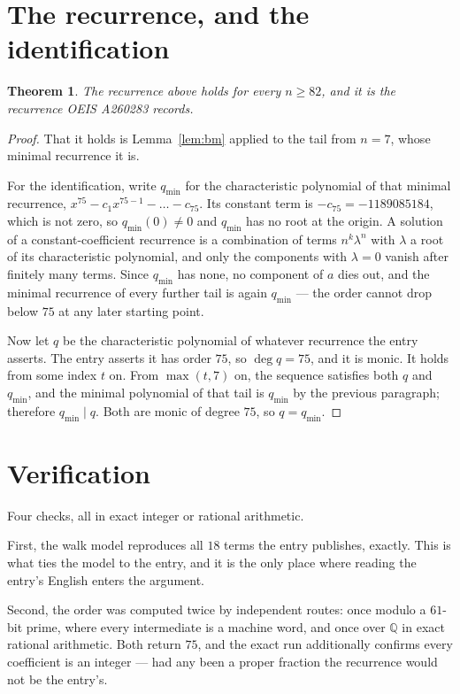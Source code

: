 \documentclass[11pt,a4paper]{article}
\theoremstyle{plain}
\newtheorem{theorem}{Theorem}
\theoremstyle{definition}
\begin{document}
\section{The recurrence, and the identification}

\begin{theorem}
The recurrence above holds for every $n\ge82$, and it is the recurrence OEIS A260283 records.
\end{theorem}

\begin{proof}
That it holds is Lemma~\ref{lem:bm} applied to the tail from $n=7$, whose minimal
recurrence it is.

For the identification, write $q_{\min}$ for the characteristic polynomial of that minimal
recurrence, $x^{75}-c_1x^{75-1}-\dots-c_{75}$. Its constant term is
$-c_{75}=-1189085184$, which is not zero, so $q_{\min}(0)\neq0$ and $q_{\min}$ has no
root at the origin. A solution of a constant-coefficient recurrence is a combination of terms
$n^{k}\lambda^{n}$ with $\lambda$ a root of its characteristic polynomial, and only the
components with $\lambda=0$ vanish after finitely many terms. Since $q_{\min}$ has none, no
component of $a$ dies out, and the minimal recurrence of every further tail is again
$q_{\min}$ --- the order cannot drop below $75$ at any later starting point.

Now let $q$ be the characteristic polynomial of whatever recurrence the entry asserts. The
entry asserts it has order $75$, so $\deg q=75$, and it is monic. It holds from some
index $t$ on. From $\max(t,7)$ on, the sequence satisfies both $q$ and $q_{\min}$, and
the minimal polynomial of that tail is $q_{\min}$ by the previous paragraph; therefore
$q_{\min}\mid q$. Both are monic of degree $75$, so $q=q_{\min}$.
\end{proof}

\section{Verification}

Four checks, all in exact integer or rational arithmetic.

First, the walk model reproduces all $18$ terms the entry publishes, exactly. This is
what ties the model to the entry, and it is the only place where reading the entry's English
enters the argument.

Second, the order was computed twice by independent routes: once modulo a $61$-bit prime, where
every intermediate is a machine word, and once over $\mathbb{Q}$ in exact rational arithmetic.
Both return $75$, and the exact run additionally confirms every coefficient is an integer
--- had any been a proper fraction the recurrence would not be the entry's.
\end{document}
